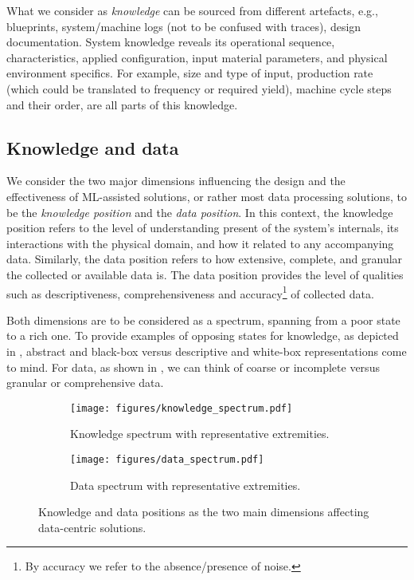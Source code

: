 What we consider as \emph{knowledge} can be sourced from different artefacts, e.g., blueprints, system/machine logs (not to be confused with traces), design documentation. System knowledge reveals its operational sequence, characteristics, applied configuration, input material parameters, and physical environment specifics. For example, size and type of input, production rate (which could be translated to frequency or required yield), machine cycle steps and their order, are all parts of this knowledge.

\subsection{Knowledge and data}
We consider the two major dimensions influencing the design and the effectiveness of ML-assisted solutions, or rather most data processing solutions, to be the \emph{knowledge position} and the \emph{data position}. In this context, the knowledge position refers to the level of understanding present of the system's internals, its interactions with the physical domain, and how it related to any accompanying data. Similarly, the data position refers to how extensive, complete, and granular the collected or available data is. The data position provides the level of qualities such as descriptiveness, comprehensiveness and accuracy\footnote{By accuracy we refer to the absence/presence of noise.} of collected data.

Both dimensions are to be considered as a spectrum, spanning from a poor state to a rich one. To provide examples of opposing states for knowledge, as depicted in , abstract and black-box versus descriptive and white-box representations come to mind. For data, as shown in , we can think of coarse or incomplete versus granular or comprehensive data.
%
\begin{figure}[htbp]
    \centering
    \begin{subfigure}{\linewidth}
    	\centering
	    \texttt{[image: figures/knowledge\_spectrum.pdf]}
	    \caption{Knowledge spectrum with representative extremities.}
	    \label{fig:knowledge_spectrum}
    \end{subfigure}
    \qquad
    \begin{subfigure}{\linewidth}
    	\centering
    	\texttt{[image: figures/data\_spectrum.pdf]}
		\caption{Data spectrum with representative extremities.}
		\label{fig:data_spectrum}
    \end{subfigure}
	\caption{Knowledge and data positions as the two main dimensions affecting data-centric solutions.}
	\label{fig:spectrums}
\end{figure}


